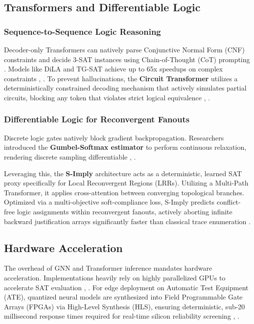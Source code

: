 \documentclass[conference]{IEEEtran}
\begin{document}
\subsection{Transformers and Differentiable Logic}

\subsubsection{Sequence-to-Sequence Logic Reasoning}
Decoder-only Transformers can natively parse Conjunctive Normal Form (CNF) constraints and decide 3-SAT instances using Chain-of-Thought (CoT) prompting \cite{transformers-sat-pan}. Models like DiLA and TG-SAT achieve up to 65x speedups on complex constraints \cite{stephan1996combinational}, \cite{dila-arxiv}. To prevent hallucinations, the \textbf{Circuit Transformer} utilizes a deterministically constrained decoding mechanism that actively simulates partial circuits, blocking any token that violates strict logical equivalence \cite{circuit-transformer-iclr}, \cite{approx-logic-synth}.

\subsubsection{Differentiable Logic for Reconvergent Fanouts}
Discrete logic gates natively block gradient backpropagation. Researchers introduced the \textbf{Gumbel-Softmax estimator} to perform continuous relaxation, rendering discrete sampling differentiable \cite{huang2021machine}, \cite{differentiable-logic-machines}.

Leveraging this, the \textbf{S-Imply} architecture acts as a deterministic, learned SAT proxy specifically for Local Reconvergent Regions (LRRs). Utilizing a Multi-Path Transformer, it applies cross-attention between converging topological branches. Optimized via a multi-objective soft-compliance loss, S-Imply predicts conflict-free logic assignments within reconvergent fanouts, actively aborting infinite backward justification arrays significantly faster than classical trace enumeration \cite{huang2021machine}.

\subsection{Hardware Acceleration}
The overhead of GNN and Transformer inference mandates hardware acceleration. Implementations heavily rely on highly parallelized GPUs to accelerate SAT evaluation \cite{fpgnn-atpg-ss}, \cite{iccad-2025-program}. For edge deployment on Automatic Test Equipment (ATE), quantized neural models are synthesized into Field Programmable Gate Arrays (FPGAs) via High-Level Synthesis (HLS), ensuring deterministic, sub-20 millisecond response times required for real-time silicon reliability screening \cite{guo2019survey}, \cite{huang2021machine}.
\end{document}
